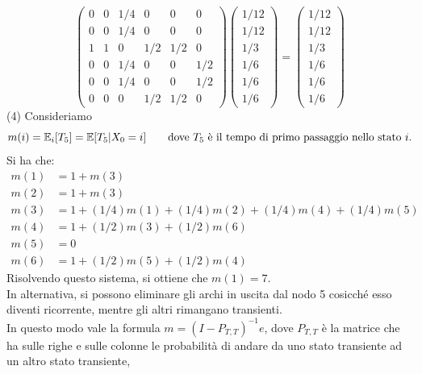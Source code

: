 \documentclass[
	12pt, %
]{fphw}
\begin{document}
	\begin{equation*}
		\begin{pmatrix}
			0 & 0 & 1/4 & 0 & 0 & 0\\
			0 & 0 & 1/4 & 0 & 0 & 0\\
			1 & 1 & 0 & 1/2 & 1/2 & 0\\
			0 & 0 & 1/4 & 0 & 0 & 1/2\\
			0 & 0 & 1/4 & 0 & 0 & 1/2\\
			0 & 0 & 0 & 1/2 & 1/2 & 0
		\end{pmatrix}
		\begin{pmatrix}
			1/12 \\ 1/12 \\ 1/3 \\ 1/6 \\ 1/6 \\ 1/6
		\end{pmatrix}
		=
		\begin{pmatrix}
			1/12 \\ 1/12 \\ 1/3 \\ 1/6 \\ 1/6 \\ 1/6
		\end{pmatrix}
	\end{equation*}
	(4) Consideriamo
	\begin{equation*}
		m(i) = \mathbb{E}_i [T_5] = \mathbb{E}[T_5 | X_0 = i] \qquad \textnormal{dove }T_5\textnormal{ è il tempo di primo passaggio nello stato }i.
	\end{equation*}
	Si ha che:
	\begin{align*}
		m(1) &= 1 + m(3)\\
		m(2) &= 1 + m(3)\\
		m(3) &= 1 + (1/4)m(1) + (1/4)m(2) + (1/4)m(4) + (1/4)m(5)\\
		m(4) &= 1 + (1/2)m(3) + (1/2)m(6)\\
		m(5) &= 0\\
		m(6) &= 1 + (1/2)m(5) + (1/2)m(4)
	\end{align*}
	Risolvendo questo sistema, si ottiene che $m(1) = 7$.\\
	In alternativa, si possono eliminare gli archi in uscita dal nodo 5 cosicché esso diventi ricorrente, mentre gli altri rimangano transienti.\\
	In questo modo vale la formula $m = (I - P_{T,T})^{-1}e$,
	dove $P_{T,T}$ è la matrice che ha sulle righe e sulle colonne le probabilità di andare da uno stato transiente ad un altro stato transiente,
\end{document}
